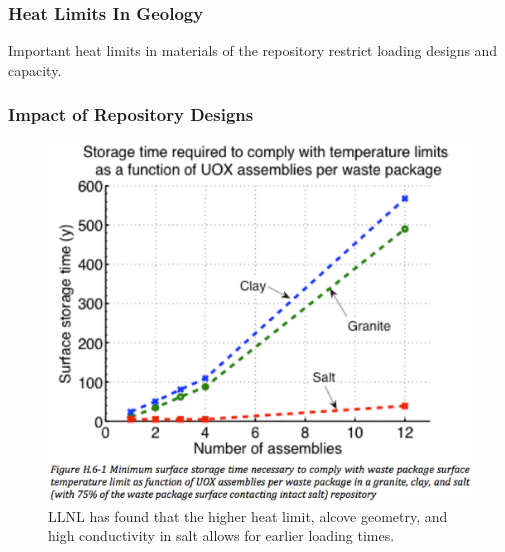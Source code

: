 

\begin{frame}[ctb!]
  \frametitle{Heat Limits In Geology}
  Important heat limits in materials of the repository restrict loading designs 
  and capacity.
  
\end{frame}

\begin{frame}[ctb!]
  \frametitle{Impact of Repository Designs}
   
   \begin{figure}[h!]
     \begin{center}
       \includegraphics[height=.5\textheight]{llnlGeos.eps}
     \end{center}
     \caption{LLNL has found that the higher heat limit, alcove geometry, and 
     high conductivity in salt allows for earlier loading times.}
     \label{fig:llnlGeos}
   \end{figure}
\end{frame}

